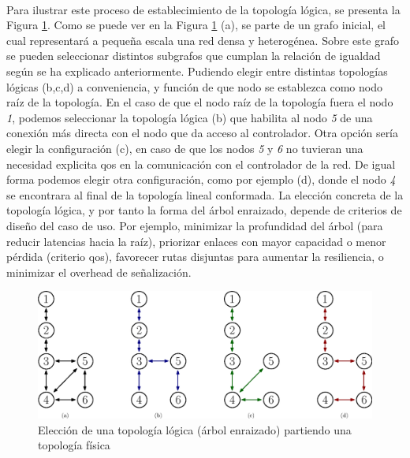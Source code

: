 \\
Para ilustrar este proceso de establecimiento de la topología lógica, se presenta la Figura \ref{fig:topo_logic_1}. Como se puede ver en la Figura \ref{fig:topo_logic_1} (a), se parte de un grafo inicial, el cual representará a pequeña escala una red densa y heterogénea. Sobre este grafo se pueden seleccionar distintos subgrafos que cumplan la relación de igualdad según se ha explicado anteriormente. Pudiendo elegir entre distintas topologías lógicas (b,c,d) a conveniencia, y función de que nodo se establezca como nodo raíz de la topología. En el caso de que el nodo raíz de la topología fuera el nodo \textit{1}, podemos seleccionar la topología lógica (b) que habilita al nodo \textit{5} de una conexión más directa con el nodo que da acceso al controlador. Otra opción sería elegir la configuración (c), en caso de que los nodos \textit{5} y \textit{6} no tuvieran una necesidad explicita \gls{qos} en la comunicación con el controlador de la red.  De igual forma podemos elegir otra configuración, como por ejemplo (d), donde el nodo \textit{4} se encontrara al final de la topología lineal conformada. La elección concreta de la topología lógica, y por tanto la forma del árbol enraizado, depende de criterios de diseño del caso de uso. Por ejemplo, minimizar la profundidad del árbol (para reducir latencias hacia la raíz), priorizar enlaces con mayor capacidad o menor pérdida (criterio \gls{qos}), favorecer rutas disjuntas para aumentar la resiliencia, o minimizar el overhead de señalización. 

\begin{figure}[ht!]
   \centering
   \includegraphics[width=\textwidth]{fig/02_sota/sota_7_topo_logic_1.eps}
   \caption{Elección de una topología lógica (árbol enraizado) partiendo una topología física}
   \label{fig:topo_logic_1}
\end{figure}


